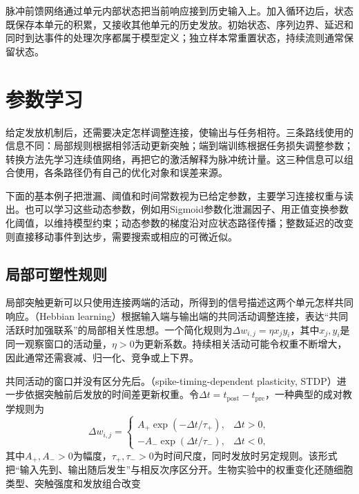 脉冲前馈网络通过单元内部状态把当前响应接到历史输入上。加入循环边后，状态既保存本单元的积累，又接收其他单元的历史发放。初始状态、序列边界、延迟和同时到达事件的处理次序都属于模型定义；独立样本常重置状态，持续流则通常保留状态。

\section{参数学习}
\label{sec:snn-learning}

给定发放机制后，还需要决定怎样调整连接，使输出与任务相符。三条路线使用的信息不同：局部规则根据相邻活动更新突触；端到端训练根据任务损失调整参数；转换方法先学习连续值网络，再把它的激活解释为脉冲统计量。这三种信息可以组合使用，各条路径仍有自己的优化对象和误差来源。

下面的基本例子把泄漏、阈值和时间常数视为已给定参数，主要学习连接权重与读出。也可以学习这些动态参数，例如用Sigmoid参数化泄漏因子、用正值变换参数化阈值，以维持模型约束；动态参数的梯度沿对应状态路径传播；整数延迟的改变则直接移动事件到达步，需要搜索或相应的可微近似。

\subsection{局部可塑性规则}
\label{sec:snn-plasticity}

局部突触更新可以只使用连接两端的活动，所得到的信号描述这两个单元怎样共同响应。（Hebbian learning）根据输入端与输出端的共同活动调整连接，表达“共同活跃时加强联系”的局部相关性思想。一个简化规则为$\Delta w_{i,j}=\eta x_jy_i$，其中$x_j,y_i$是同一观察窗口的活动量，$\eta>0$为更新系数。持续相关活动可能令权重不断增大，因此通常还需衰减、归一化、竞争或上下界。

共同活动的窗口并没有区分先后。（spike-timing-dependent plasticity, STDP）进一步依据突触前后发放的时间差更新权重。令$\Delta t=t_{\mathrm{post}}-t_{\mathrm{pre}}$，一种典型的成对教学规则为
\begin{equation}
  \Delta w_{i,j}=\begin{cases}
    A_+\exp(-\Delta t/\tau_+),&\Delta t>0,\\
    -A_-\exp(\Delta t/\tau_-),&\Delta t<0,
  \end{cases}
  \label{eq:snn-stdp}
\end{equation}
其中$A_+,A_->0$为幅度，$\tau_+,\tau_->0$为时间尺度，同时发放时另定规则。该形式把“输入先到、输出随后发生”与相反次序区分开。生物实验中的权重变化还随细胞类型、突触强度和发放组合改变

